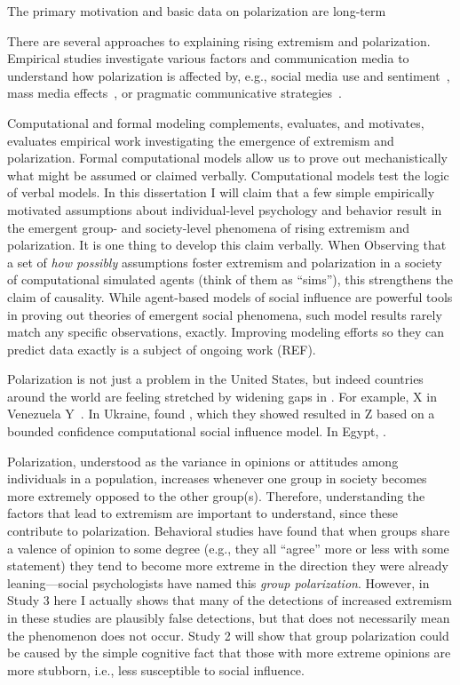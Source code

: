 \documentclass[12pt,letterpaper]{article}
\begin{document}
The primary motivation and basic data on polarization are long-term 


There are several approaches to explaining rising extremism and polarization.
Empirical studies investigate various factors and communication media to understand
how polarization is affected by, e.g., social media use and 
sentiment~\cite{Bail2018}, mass media effects~\cite{Prior2013,Pew2014,Martin2017a}, 
or pragmatic communicative 
strategies~\cite{Charteris-Black2009,Thibodeau2015,Flusberg2017,Flusberg2018,Turner2021a}.


Computational and formal modeling complements, evaluates, and motivates, evaluates 
empirical work investigating the emergence of extremism and polarization.
Formal computational models allow us to prove out mechanistically what might
be assumed or claimed verbally. Computational models test the logic of 
verbal models. In this dissertation I will claim that a few simple empirically
motivated assumptions about individual-level psychology and behavior result
in the emergent group- and society-level phenomena of rising extremism and
polarization. It is one thing to develop this claim verbally. When
Observing that a set of \emph{how possibly} assumptions foster extremism and
polarization in a society of computational simulated agents 
(think of them as ``sims''), this strengthens the claim of causality. While
agent-based models of social influence are powerful tools in proving out 
theories of emergent social phenomena, such model results rarely match any
specific observations, exactly. Improving modeling efforts so they can predict
data exactly is a subject of ongoing work (REF).

Polarization is not just a problem in the United States, but indeed countries
around the world are feeling stretched by widening gaps in . For example,
X in Venezuela Y~\cite{Morales2015}. In Ukraine,  found , 
which they showed resulted
in Z based on a bounded confidence computational social influence model. 
In Egypt, \cite{Borge-Holthoefer2014}.

Polarization, understood as the variance in opinions or attitudes among
individuals in a population, increases whenever one group in society 
becomes more extremely opposed to the other group(s). Therefore, understanding
the factors that lead to extremism are important to understand, since these
contribute to polarization. Behavioral studies have found that when groups share a valence of
opinion to some degree (e.g., they all ``agree'' more or less with some
statement) they tend to become more extreme in the direction they were already
leaning---social psychologists have named this \emph{group polarization}.
However, in Study 3 here I actually shows that many of the detections of 
increased extremism in these studies are plausibly false detections, but that
does not necessarily mean the phenomenon does not occur. Study 2 will show
that group polarization could be caused by the simple cognitive fact that
those with more extreme opinions are more stubborn, i.e., less susceptible
to social influence.
\end{document}
